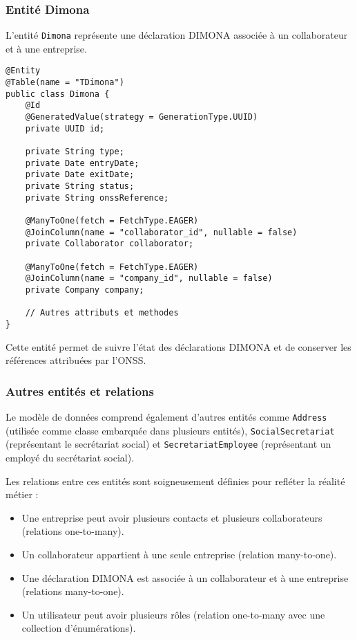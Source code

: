 \subsubsection{Entité Dimona}

L'entité \texttt{Dimona} représente une déclaration DIMONA associée à un collaborateur et à une entreprise.

\begin{lstlisting}
@Entity
@Table(name = "TDimona")
public class Dimona {
    @Id
    @GeneratedValue(strategy = GenerationType.UUID)
    private UUID id;
    
    private String type;
    private Date entryDate;
    private Date exitDate;
    private String status;
    private String onssReference;
    
    @ManyToOne(fetch = FetchType.EAGER)
    @JoinColumn(name = "collaborator_id", nullable = false)
    private Collaborator collaborator;
    
    @ManyToOne(fetch = FetchType.EAGER)
    @JoinColumn(name = "company_id", nullable = false)
    private Company company;
    
    // Autres attributs et methodes
}
\end{lstlisting}

Cette entité permet de suivre l'état des déclarations DIMONA et de conserver les références attribuées par l'ONSS.

\subsubsection{Autres entités et relations}

Le modèle de données comprend également d'autres entités comme \texttt{Address} (utilisée comme classe embarquée dans plusieurs entités), \texttt{SocialSecretariat} (représentant le secrétariat social) et \texttt{SecretariatEmployee} (représentant un employé du secrétariat social).

Les relations entre ces entités sont soigneusement définies pour refléter la réalité métier :
\begin{itemize}
  \item Une entreprise peut avoir plusieurs contacts et plusieurs collaborateurs (relations one-to-many).
  \item Un collaborateur appartient à une seule entreprise (relation many-to-one).
  \item Une déclaration DIMONA est associée à un collaborateur et à une entreprise (relations many-to-one).
  \item Un utilisateur peut avoir plusieurs rôles (relation one-to-many avec une collection d'énumérations).
\end{itemize}

